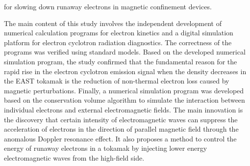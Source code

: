 \begin{abstract*}
for slowing down runaway electrons in magnetic confinement devices.
\par
The main content of this study involves the independent development of numerical calculation programs for electron kinetics and a digital simulation platform for electron cyclotron radiation diagnostics. The correctness of the programs was verified using standard models. Based on the developed numerical simulation program, the study confirmed that the fundamental reason for the rapid rise in the electron cyclotron emission signal when the density decreases in the EAST tokamak is the reduction of non-thermal electron loss caused by magnetic perturbations. Finally, a numerical simulation program was developed based on the conservation volume algorithm to simulate the interaction between individual electrons and external electromagnetic fields. The main innovation is the discovery that certain intensity of electromagnetic waves can suppress the acceleration of electrons in the direction of parallel magnetic field through the anomalous Doppler resonance effect. It also proposes a method to control the energy of runaway electrons in a tokamak by injecting lower energy electromagnetic waves from the high-field side.
\end{abstract*}














